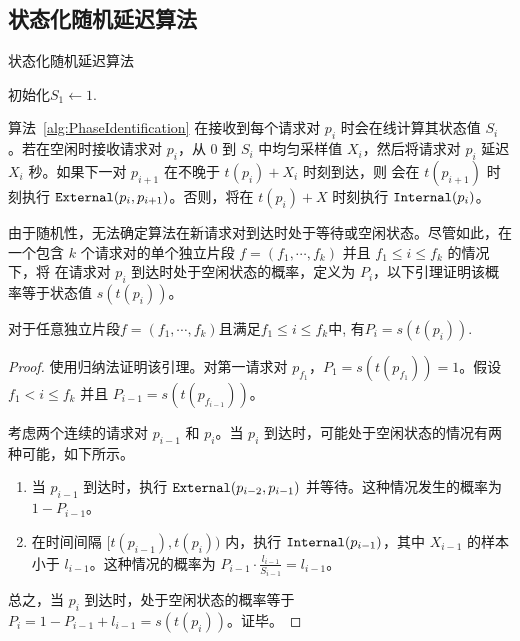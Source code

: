 \subsection{状态化随机延迟算法} \label{subsec:rdsa}

\begin{algorithm}
\caption{状态化随机延迟算法 \ralgo}
\label{alg:randomizedalgo}
初始化$S_1 \leftarrow 1.$\\
\While{算法空闲时，在时刻$t(p_i)$接收请求对$p_i$}{
    $S_i \leftarrow \min\{1-S_{i-1}+l_{i-1}, 1\}$\\
    采样$X_i \sim \mathbf{U}(0, S_i)$\\
    \eIf{在时间段$( t(p_i), t(p_i)+X_i ]$接收请求对$p_{i+1}$ }{
        $ S_{i+1} \leftarrow \min\{1-S_{i}+l_{i}, 1\}$\\
        $M$ add $\Exter(p_i, p_{i+1})$ at time $t(p_{i+1})$\\
    }{
        $M$ add $\Inter(p_i)$ at time $t(p_i)+X$\\
    }
}
\end{algorithm}
算法~\ref{alg:PhaseIdentification} 在接收到每个请求对 $p_i$ 时会在线计算其状态值 $S_i$。若\ralgo 在空闲时接收请求对 $p_i$，从 $0$ 到 $S_i$ 中均匀采样值 $X_i$，然后将请求对 $p_i$ 延迟 $X_i$ 秒。如果下一对 $p_{i+1}$ 在不晚于 $t(p_i)+X_i$ 时刻到达，则 \ralgo 会在 $t(p_{i+1})$ 时刻执行 $\Exter(p_i, p_{i+1})$。否则，\ralgo 将在 $t(p_i)+X$ 时刻执行 $\Inter(p_i)$。

由于随机性，无法确定算法\ralgo 在新请求对到达时处于等待或空闲状态。尽管如此，在一个包含 $k$ 个请求对的单个独立片段 $f=(f_1, \cdots, f_k)$ 并且 $f_1\leq i\leq f_k$ 的情况下，将 \ralgo 在请求对 $p_i$ 到达时处于空闲状态的概率，定义为 $P_i$，以下引理证明该概率等于状态值 $s(t(p_i))$。

\begin{lemma} \label{lem:probability}
     对于任意独立片段$f=(f_1, \cdots, f_k)$且满足$f_1\leq i\leq f_k$中, 有$P_i=s(t(p_i))$.
\end{lemma}

\begin{proof}
使用归纳法证明该引理。对第一请求对 $p_{f_1}$，$P_1=s(t(p_{f_1}))=1$。假设 $f_1<i\leq f_k$ 并且 $P_{i-1}=s(t(p_{f_{i-1}}))$。

考虑两个连续的请求对 $p_{i-1}$ 和 $p_i$。当 $p_i$ 到达时，\ralgo 可能处于空闲状态的情况有两种可能，如下所示。
\renewcommand{\labelenumi}{(\arabic{enumi})}
\begin{enumerate}[align=left, labelsep=0.3em, itemindent=2.3em, 
leftmargin=0em]
    \item 当 $p_{i-1}$ 到达时，\ralgo 执行 $\Exter(p_{i-2}, p_{i-1})$ 并等待。这种情况发生的概率为 $1-P_{i-1}$。
    \item 在时间间隔 $[t(p_{i-1}), t(p_i))$ 内，\ralgo 执行 $\Inter(p_{i-1})$，其中 $X_{i-1}$ 的样本小于 $l_{i-1}$。这种情况的概率为 $P_{i-1}\cdot \frac{l_{i-1}}{S_{i-1}} = l_{i-1}$。
\end{enumerate}

总之，当 $p_i$ 到达时，\ralgo 处于空闲状态的概率等于 $P_i = 1 - P_{i-1} + l_{i-1} =s(t(p_i))$。证毕。
\end{proof}

